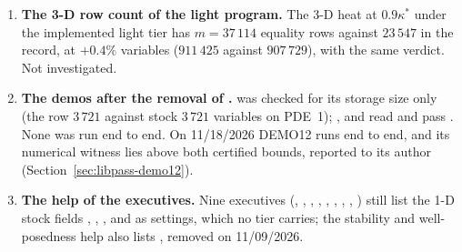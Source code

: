 \begin{enumerate}
\item \textbf{The 3-D row count of the light  program.} The 3-D heat at $0.9\kappa^*$ under the implemented light tier has $m=37\,114$ equality rows against $23\,547$ in the record, at $+0.4\%$ variables ($911\,425$ against $907\,729$), with the same verdict. Not investigated.
\item \textbf{The demos after the removal of .}  was checked for its storage size only (the row $3\,721$ against stock $3\,721$ variables on PDE~1); ,  and  read  and pass . None was run end to end. On 11/18/2026 DEMO12 runs end to end, and its numerical witness lies above both certified bounds, reported to its author (Section~\ref{sec:libpass-demo12}).
\item \textbf{The help of the executives.} Nine executives (, , , , , , , , ) still list the 1-D stock fields , , ,  and  as settings, which no tier carries; the stability and well-posedness help also lists , removed on 11/09/2026.

\end{enumerate}
